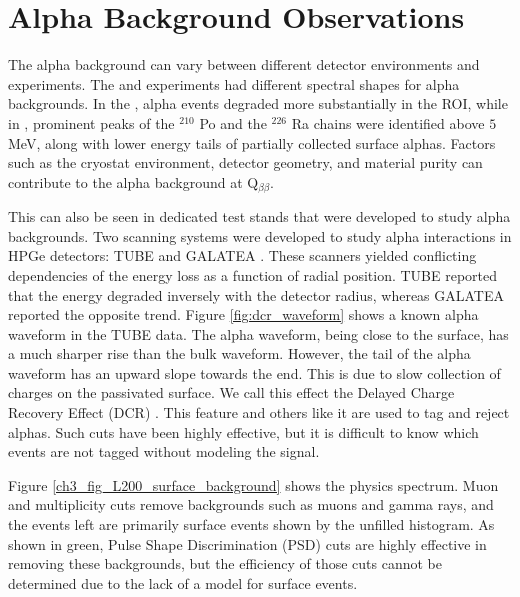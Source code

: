 \section{Alpha Background Observations}
\label{ch3_sec_alpha}
The alpha background can vary between different detector environments and experiments. The {\MJD} and {\Gerda} experiments had different spectral shapes for alpha backgrounds. In the {\MJD}, alpha events degraded more substantially in the {\onbb} ROI, while in \Gerda, prominent peaks of the $^{210}$ Po and the $^{226}$ Ra chains were identified above $5$ MeV, along with lower energy tails of partially collected surface alphas. Factors such as the cryostat environment, detector geometry, and material purity can contribute to the alpha background at Q$_{\beta\beta}$.

This can also be seen in dedicated test stands that were developed to study alpha backgrounds. Two scanning systems were developed to study alpha interactions in HPGe detectors: TUBE \cite{TUBE_paper} and GALATEA \cite{galatea_paper}. These scanners yielded conflicting dependencies of the energy loss as a function of radial position. TUBE reported that the energy degraded inversely with the detector radius, whereas GALATEA reported the opposite trend. Figure \ref{fig:dcr_waveform} shows a known alpha waveform in the TUBE data. The alpha waveform, being close to the surface, has a much sharper rise than the bulk waveform. However, the tail of the alpha waveform has an upward slope towards the end. This is due to slow collection of charges on the passivated surface. We call this effect the Delayed Charge Recovery Effect (DCR) \cite{Gruszko:2017kfx}. This feature and others like it are used to tag and reject alphas. Such cuts have been highly effective, but it is difficult to know which events are not tagged without modeling the signal.

Figure \ref{ch3_fig_L200_surface_background} shows the {\Ltwo} physics spectrum. Muon and multiplicity cuts remove backgrounds such as muons and gamma rays, and the events left are primarily surface events shown by the unfilled histogram. As shown in green, Pulse Shape Discrimination (PSD) cuts are highly effective in removing these backgrounds, but the efficiency of those cuts cannot be determined due to the lack of a model for surface events. 

